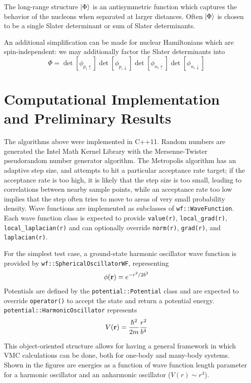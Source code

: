 \documentclass[aps,prl,preprint,groupedaddress]{revtex4-1}
\begin{document}
The long-range structure \(\ket{\Phi}\) is an antisymmetric function which captures
the behavior of the nucleons when separated at larger distances. Often \(\ket{\Phi}\)
is chosen to be a single Slater determinant or sum of Slater determinants.

An additional simplification can be made for nuclear Hamiltonians which are
spin-independent: we may additionally factor the Slater determinants into
\cite{pederiva_roggero_schmidt_2016}
\[ \Phi = \det[\phi_{p_i \uparrow}] \det[\phi_{p_i \downarrow}]
\det[\phi_{n_i \uparrow}] \det[\phi_{n_i \downarrow}] \]

\section{Computational Implementation and Preliminary Results}
The algorithms above were implemented in C++11. Random numbers are generated the
Intel Math Kernel Library with the Mersenne-Twister pseudorandom number
generator algorithm. The Metropolis algorithm has an adaptive step size, and
attempts to hit a particular acceptance rate target; if the acceptance rate is
too high, it is likely that the step size is too small, leading to correlations
between nearby sample points, while an acceptance rate too low implies that the
step often tries to move to areas of very small probability density. Wave
functions are implemented as subclasses of \texttt{wf::WaveFunction}.
Each wave function class is expected to provide \texttt{value(r)},
\texttt{local_grad(r)}, \texttt{local_laplacian(r)} and can
optionally override \texttt{norm(r)}, \texttt{grad(r)}, and
\texttt{laplacian(r)}.

For the simplest test case, a ground-state harmonic oscillator wave function is
provided by \texttt{wf::SphericalOscillatorWF}, representing
\[ \phi(\vb{r}) = e^{-r^2/2b^2} \]
Potentials are defined by the \texttt{potential::Potential} class and
are expected to override \texttt{operator()} to accept the state and
return a potential energy. \texttt{potential::HarmonicOscillator} represents
\[ V(\vb{r}) = \frac{\hbar^2}{2 m} \frac{r^2}{b^4} \]

This object-oriented structure allows for having a general framework in which
VMC calculations can be done, both for one-body and many-body systems. Shown
in the figures are energies as a function of wave function length parameter for
a harmonic oscillator and an anharmonic oscillator (\(V(r) \sim r^4\)).
\end{document}
